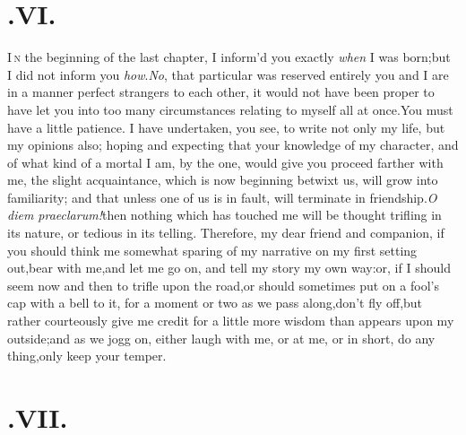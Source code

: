 \documentclass{article}
\begin{document}
\section{.\enspace VI.}

\lettrine{I}{\,n} the beginning of the last chapter,
I inform’d you exactly \textit{when} I was born;\tsk but I did not inform
you \textit{how}.\break\textit{No}, that particular was reserved entirely 
you and I are in a manner
perfect stran\-gers to each other, it would not have been proper to
have let you into too many circumstances relating to myself all at
once.\tsk You must have a little patience. I have undertaken, you see, to write not only my life,
but my opinions also; hoping and expecting that your knowledge
of my character, and of what kind of a
mortal I am, by the one, would give you
proceed farther with me, the slight ac\-quaintance, which is now beginning betwixt us,
will grow into familiarity; and that unless one of us is in fault, will\break
terminate in friendship.\tsk  \textit{O diem
prae\-clarum!}\tsh  then nothing which has touched me will be
thought trifling in its nature, or tedious in its telling.\break
Therefore, my dear friend and companion, if you should think me
somewhat sparing of my narrative on my first setting out,\tsk  bear
with me,\tsk  and let me go on, and tell my story my own
way:\tsh  or, if I should seem now and then to trifle upon the
road,\tsk  or should sometimes put on a fool’s cap with a
bell to it, for a moment or two as we pass along,\tsk  don’t
fly off,\tsk  but rather courteously give me credit for a little
more wisdom than appears upon my outside;\tsk  and as we jogg on, either laugh with
me, or at me, or in short, do any thing,\tsk  only keep your temper.

\section{.\enspace VII.}
\end{document}
